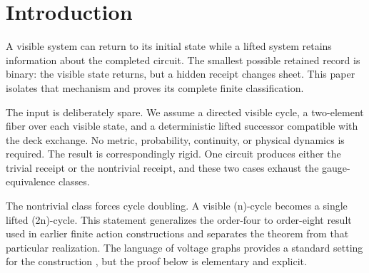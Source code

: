\section{Introduction}

A visible system can return to its initial state while a lifted system retains
information about the completed circuit. The smallest possible retained
record is binary: the visible state returns, but a hidden receipt changes
sheet. This paper isolates that mechanism and proves its complete finite
classification.

The input is deliberately spare. We assume a directed visible cycle, a
two-element fiber over each visible state, and a deterministic lifted
successor compatible with the deck exchange. No metric, probability,
continuity, or physical dynamics is required. The result is correspondingly
rigid. One circuit produces either the trivial receipt or the nontrivial
receipt, and these two cases exhaust the gauge-equivalence classes.

The nontrivial class forces cycle doubling. A visible (n)-cycle becomes a
single lifted (2n)-cycle. This statement generalizes the order-four to
order-eight result used in earlier finite action constructions and separates
the theorem from that particular realization. The language of voltage graphs
provides a standard setting for the construction \cite{gross-tucker}, but the
proof below is elementary and explicit.

